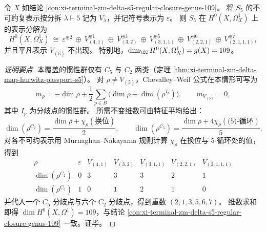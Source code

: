 \begin{conclusion}\label{con:xi-terminal-zm-delta-s5-holomorphic-oneforms-chevalley-weil}
令 \(X\) 如结论 \ref{con:xi-terminal-zm-delta-s5-regular-closure-genus-109}。
将 \(S_5\) 的不可约复表示按分拆 \(\lambda\vdash 5\) 记为 \(V_\lambda\)，并记符号表示为 \(\varepsilon\)。
则 \(S_5\) 在 \(H^0(X,\Omega_X^1)\) 上的表示分解为
\[
H^0(X,\Omega_X^1)\ \cong\
\varepsilon^{\oplus 2}\ \oplus\
V_{(4,1)}^{\oplus 1}\ \oplus\
V_{(3,2)}^{\oplus 3}\ \oplus\
V_{(3,1,1)}^{\oplus 5}\ \oplus\
V_{(2,2,1)}^{\oplus 6}\ \oplus\
V_{(2,1,1,1)}^{\oplus 7},
\]
并且平凡表示 \(V_{(5)}\) 不出现。
特别地，\(\dim_\CC H^0(X,\Omega_X^1)=g(X)=109\)。
\end{conclusion}
\begin{proof}[证明要点]
本覆盖的惯性群仅有 \(C_5\) 与 \(C_2\) 两类（定理 \ref{thm:xi-terminal-zm-delta-map-hurwitz-passport-s5}）。
对 \(\rho\neq V_{(5)}\)，Chevalley--Weil 公式在本情形可写为
\[
m_\rho=-\dim\rho+\frac12\sum_{p\in B}\bigl(\dim\rho-\dim(\rho^{I_p})\bigr),
\qquad
m_{V_{(5)}}=0,
\]
其中 \(I_p\) 为分歧点的惯性群。
所需不变维数可由特征平均给出：
\[
\dim(\rho^{C_2})=\frac{\dim\rho+\chi_\rho(\text{换位})}{2},
\qquad
\dim(\rho^{C_5})=\frac{\dim\rho+4\chi_\rho(\text{(5)-循环})}{5}.
\]
对各不可约表示用 Murnaghan--Nakayama 规则计算 \(\chi_\rho\) 在换位与 \(5\)-循环处的值，得到
\[
\begin{array}{c|cccccc}
\rho & \varepsilon & V_{(4,1)} & V_{(3,2)} & V_{(3,1,1)} & V_{(2,2,1)} & V_{(2,1,1,1)}\\
\hline
\dim(\rho^{C_2}) & 0 & 3 & 3 & 3 & 2 & 1\\
\dim(\rho^{C_5}) & 1 & 0 & 1 & 2 & 1 & 0
\end{array}
\]
并代入一个 \(C_5\) 分歧点与六个 \(C_2\) 分歧点，得到重数
\(
(2,1,3,5,6,7)
\)。
维数求和即得 \(\dim H^0(X,\Omega^1)=109\)，与结论 \ref{con:xi-terminal-zm-delta-s5-regular-closure-genus-109} 一致。证毕。
\end{proof}




